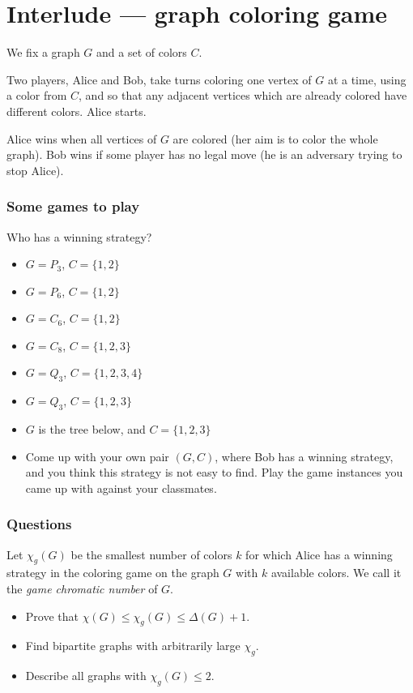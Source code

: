 \chapter{Interlude --- graph coloring game}

We fix a graph $G$ and a set of colors $C$.

Two players, Alice and Bob, take turns coloring one vertex of $G$ at a time, using a color from $C$, and so that any adjacent vertices which are already colored have different colors. Alice starts. 

Alice wins when all vertices of $G$ are colored (her aim is to color the whole graph). Bob wins if some player has no legal move (he is an adversary trying to stop Alice).

\subsection*{Some games to play}
\medskip

Who has a winning strategy?
\begin{itemize}
\item $G=P_3$, $C=\{1,2\}$
\item $G=P_6$, $C=\{1,2\}$
\item $G=C_6$, $C=\{1,2\}$
\item $G=C_8$, $C=\{1,2,3\}$
\item $G=Q_3$, $C=\{1,2,3,4\}$
\item $G=Q_3$, $C=\{1,2,3\}$
\item $G$ is the tree below, and $C=\{1,2,3\}$
\item Come up with your own pair $(G,C)$, where Bob has a winning strategy, and you think this strategy is not easy to find. Play the game instances you came up with against your classmates.
\end{itemize}

\subsection*{Questions}
\medskip
Let $\chi_g(G)$ be the smallest number of colors $k$ for which Alice has a winning strategy in the coloring game on the graph $G$ with $k$ available colors. We call it the \emph{game chromatic number} of $G$.

\begin{itemize}
\item Prove that $\chi(G)\leq \chi_g(G)\leq \Delta(G)+1$.
\item Find bipartite graphs with arbitrarily large $\chi_g$.
\item Describe all graphs with $\chi_g(G)\leq 2$.
\end{itemize}
